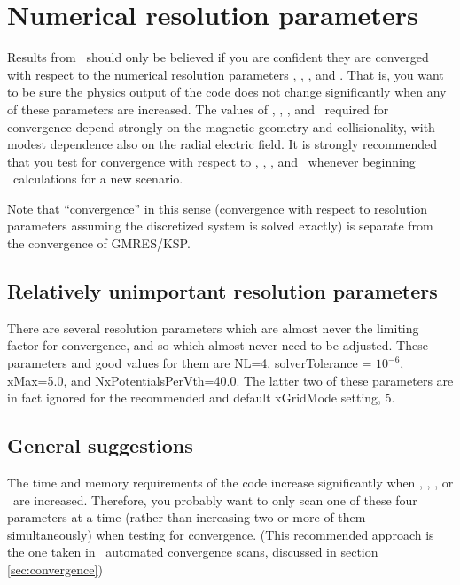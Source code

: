 \chapter{Numerical resolution parameters}
\label{ch:resolution}

Results from \sfincs~should only be believed if you are confident they
are converged with respect to the numerical resolution parameters
\Ntheta, \Nzeta, \Nxi, and \Nx.  That is, you want to be sure the
physics output of the code does not change significantly when any of
these parameters are increased. The values of \Ntheta, \Nzeta, \Nxi,
and \Nx~required for convergence depend strongly on the magnetic
geometry and collisionality, with modest dependence also on the radial
electric field. It is strongly recommended that you test for
convergence with respect to \Ntheta, \Nzeta, \Nxi, and \Nx~whenever
beginning \sfincs~calculations for a new scenario.

Note that ``convergence'' in this sense (convergence with respect to resolution parameters assuming the discretized
system is solved exactly) is separate from the convergence of GMRES/KSP.

\section{Relatively unimportant resolution parameters}

There are several resolution parameters which are almost never the limiting factor
for convergence, and so which almost never need to be adjusted.
These parameters and good values for them are {\ttfamily NL=4}, 
{\ttfamily solverTolerance} = $10^{-6}$,
{\ttfamily xMax=5.0},
and {\ttfamily NxPotentialsPerVth=40.0}.  The latter two of these parameters are in fact ignored
for the recommended and default {\ttfamily xGridMode} setting, 5.

\section{General suggestions}

The time and memory requirements of the code increase significantly
when \Ntheta, \Nzeta, \Nxi, or \Nx~are increased. Therefore, you
probably want to only scan one of these four parameters at a time
(rather than increasing two or more of them simultaneously) when
testing for convergence. (This recommended approach is the one taken
in \sfincsScan~automated convergence scans, discussed in section
\ref{sec:convergence})

